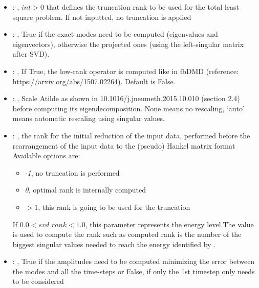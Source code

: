 \begin{itemize}
    \item {}: , 
      $int > 0$ that defines the truncation rank to be used for the total
      least square problem. If not inputted, no truncation is applied

    \item {}: , 
      True if the exact modes need to be computed (eigenvalues and
      eigenvectors),   otherwise the projected ones (using the left-singular matrix after SVD).

    \item {}: , 
      If True, the low-rank operator is computed like in fbDMD (reference:
      https://arxiv.org/abs/1507.02264).                                                  Default is
      False.

    \item {}: , 
      Scale Atilde as shown in 10.1016/j.jneumeth.2015.10.010 (section 2.4) before computing its
      eigendecomposition. None means no rescaling, ‘auto’ means automatic rescaling using singular
      values.

    \item {}: , 
      the rank for the initial reduction of the input data, performed before the rearrangement
      of the input data to the (pseudo) Hankel matrix format
      Available options are:                                                  \begin{itemize}
      \item \textit{-1}, no truncation is performed
      \item \textit{0}, optimal rank is internally computed
      \item \textit{$>1$}, this rank is going to be used for the truncation
      \end{itemize}                                                  If $0.0 < svd\_rank < 1.0$,
      this parameter represents the energy level.The value is used to compute the rank such
      as computed rank is the number of the biggest singular values needed to reach the energy
      identified by                                                    .

    \item {}: , 
      True if the amplitudes need to be computed minimizing the error
      between the modes and all the time-steps or False, if only the 1st timestep only needs to be
      considered


\end{itemize}
